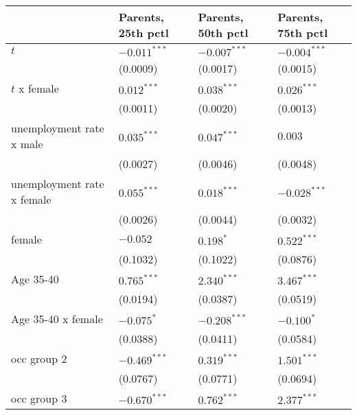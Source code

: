 \begin{tabular}{llll}
\toprule
{} & Parents, 25th pctl & Parents, 50th pctl & Parents, 75th pctl \\
\midrule
$t$                                    &     $-0.011^{***}$ &     $-0.007^{***}$ &     $-0.004^{***}$ \\
                                       &           (0.0009) &           (0.0017) &           (0.0015) \\
$t$ x female                           &      $0.012^{***}$ &      $0.038^{***}$ &      $0.026^{***}$ \\
                                       &           (0.0011) &           (0.0020) &           (0.0013) \\
unemployment rate x male               &      $0.035^{***}$ &      $0.047^{***}$ &            $0.003$ \\
                                       &           (0.0027) &           (0.0046) &           (0.0048) \\
unemployment rate x female             &      $0.055^{***}$ &      $0.018^{***}$ &     $-0.028^{***}$ \\
                                       &           (0.0026) &           (0.0044) &           (0.0032) \\
female                                 &           $-0.052$ &          $0.198^*$ &      $0.522^{***}$ \\
                                       &           (0.1032) &           (0.1022) &           (0.0876) \\
Age 35-40                              &      $0.765^{***}$ &      $2.340^{***}$ &      $3.467^{***}$ \\
                                       &           (0.0194) &           (0.0387) &           (0.0519) \\
Age 35-40 x female                     &         $-0.075^*$ &     $-0.208^{***}$ &         $-0.100^*$ \\
                                       &           (0.0388) &           (0.0411) &           (0.0584) \\
occ group 2                            &     $-0.469^{***}$ &      $0.319^{***}$ &      $1.501^{***}$ \\
                                       &           (0.0767) &           (0.0771) &           (0.0694) \\
occ group 3                            &     $-0.670^{***}$ &      $0.762^{***}$ &      $2.377^{***}$ \\

\end{tabular}
